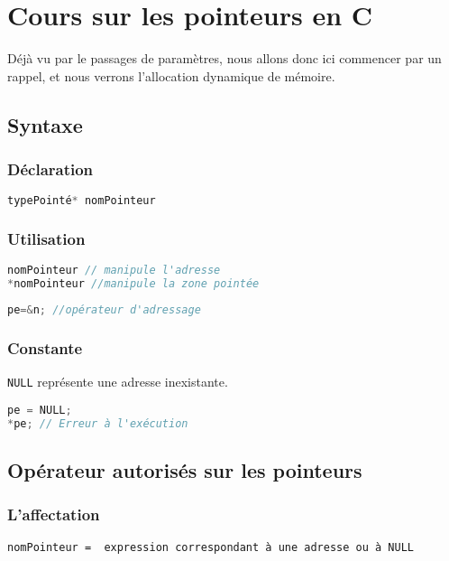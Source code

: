 \chapter{Cours sur les pointeurs en C}\label{pointeurs}
Déjà vu par le passages de paramètres, nous allons donc ici commencer par un rappel, et nous verrons l'allocation dynamique de mémoire.
\section{Syntaxe}
	\subsection{Déclaration}
\begin{lstlisting}[language=C, numbers=none,frame=none, caption=Syntaxe de déclaration d'un pointeur]
typePointé* nomPointeur
\end{lstlisting}

	\subsection{Utilisation}
\begin{lstlisting}[language=C, numbers=none,frame=none, caption=Syntaxe utilisation d'un pointeur]
nomPointeur // manipule l'adresse
*nomPointeur //manipule la zone pointée
\end{lstlisting}
\begin{lstlisting}[language=C, numbers=none,frame=none, caption=Exemple d'utilisation d'un pointeur]
pe=&n; //opérateur d'adressage
\end{lstlisting}

\subsection{Constante}
	\texttt{NULL} représente une adresse inexistante.
	\begin{lstlisting}[language=C, numbers=none,frame=none, caption=Exemple d'utilisation de la constante \texttt{NULL}]
pe = NULL;
*pe; // Erreur à l'exécution
	\end{lstlisting}

\section{Opérateur autorisés sur les pointeurs}
\subsection{L'affectation}
\begin{verbatim}
nomPointeur =  expression correspondant à une adresse ou à NULL
\end{verbatim}

